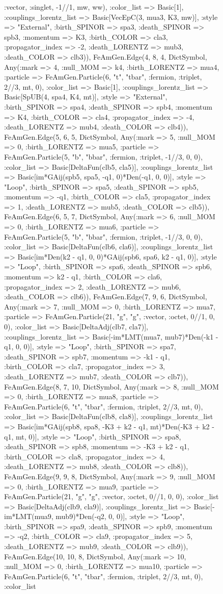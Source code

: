 \documentclass{revtex4}
\begin{document}
\begin{figure}[!htb]
\begin{center}
{:vector, :singlet, -1//1, mw, ww), :color_list => Basic[1], :couplings_lorentz_list => Basic[VecEpC(3, mua3, K3, mw)], :style => "External", :birth_SPINOR => spa3, :death_SPINOR => spb3, :momentum => K3, :birth_COLOR => cla3, :propagator_index => -2, :death_LORENTZ => mub3, :death_COLOR => clb3)), FeAmGen.Edge(4, 8, 4, Dict{Symbol, Any}(:mark => 4, :null_MOM => k4, :birth_LORENTZ => mua4, :particle => FeAmGen.Particle(6, "t", "tbar", :fermion, :triplet, 2//3, mt, 0), :color_list => Basic[1], :couplings_lorentz_list => Basic[SpUB(4, spa4, K4, mt)], :style => "External", :birth_SPINOR => spa4, :death_SPINOR => spb4, :momentum => K4, :birth_COLOR => cla4, :propagator_index => -4, :death_LORENTZ => mub4, :death_COLOR => clb4)), FeAmGen.Edge(5, 6, 5, Dict{Symbol, Any}(:mark => 5, :null_MOM => 0, :birth_LORENTZ => mua5, :particle => FeAmGen.Particle(5, "b", "bbar", :fermion, :triplet, -1//3, 0, 0), :color_list => Basic[DeltaFun(clb5, cla5)], :couplings_lorentz_list => Basic[im*GAij(spb5, spa5, -q1, 0)*Den(-q1, 0, 0)], :style => "Loop", :birth_SPINOR => spa5, :death_SPINOR => spb5, :momentum => -q1, :birth_COLOR => cla5, :propagator_index => 1, :death_LORENTZ => mub5, :death_COLOR => clb5)), FeAmGen.Edge(6, 5, 7, Dict{Symbol, Any}(:mark => 6, :null_MOM => 0, :birth_LORENTZ => mua6, :particle => FeAmGen.Particle(5, "b", "bbar", :fermion, :triplet, -1//3, 0, 0), :color_list => Basic[DeltaFun(clb6, cla6)], :couplings_lorentz_list => Basic[im*Den(k2 - q1, 0, 0)*GAij(spb6, spa6, k2 - q1, 0)], :style => "Loop", :birth_SPINOR => spa6, :death_SPINOR => spb6, :momentum => k2 - q1, :birth_COLOR => cla6, :propagator_index => 2, :death_LORENTZ => mub6, :death_COLOR => clb6)), FeAmGen.Edge(7, 9, 6, Dict{Symbol, Any}(:mark => 7, :null_MOM => 0, :birth_LORENTZ => mua7, :particle => FeAmGen.Particle(21, "g", "g", :vector, :octet, 0//1, 0, 0), :color_list => Basic[DeltaAdj(clb7, cla7)], :couplings_lorentz_list => Basic[-im*LMT(mua7, mub7)*Den(-k1 - q1, 0, 0)], :style => "Loop", :birth_SPINOR => spa7, :death_SPINOR => spb7, :momentum => -k1 - q1, :birth_COLOR => cla7, :propagator_index => 3, :death_LORENTZ => mub7, :death_COLOR => clb7)), FeAmGen.Edge(8, 7, 10, Dict{Symbol, Any}(:mark => 8, :null_MOM => 0, :birth_LORENTZ => mua8, :particle => FeAmGen.Particle(6, "t", "tbar", :fermion, :triplet, 2//3, mt, 0), :color_list => Basic[DeltaFun(clb8, cla8)], :couplings_lorentz_list => Basic[im*GAij(spb8, spa8, -K3 + k2 - q1, mt)*Den(-K3 + k2 - q1, mt, 0)], :style => "Loop", :birth_SPINOR => spa8, :death_SPINOR => spb8, :momentum => -K3 + k2 - q1, :birth_COLOR => cla8, :propagator_index => 4, :death_LORENTZ => mub8, :death_COLOR => clb8)), FeAmGen.Edge(9, 9, 8, Dict{Symbol, Any}(:mark => 9, :null_MOM => 0, :birth_LORENTZ => mua9, :particle => FeAmGen.Particle(21, "g", "g", :vector, :octet, 0//1, 0, 0), :color_list => Basic[DeltaAdj(clb9, cla9)], :couplings_lorentz_list => Basic[-im*LMT(mua9, mub9)*Den(-q2, 0, 0)], :style => "Loop", :birth_SPINOR => spa9, :death_SPINOR => spb9, :momentum => -q2, :birth_COLOR => cla9, :propagator_index => 5, :death_LORENTZ => mub9, :death_COLOR => clb9)), FeAmGen.Edge(10, 10, 8, Dict{Symbol, Any}(:mark => 10, :null_MOM => 0, :birth_LORENTZ => mua10, :particle => FeAmGen.Particle(6, "t", "tbar", :fermion, :triplet, 2//3, mt, 0), :color_list }
\end{center}
\end{figure}
\end{document}
